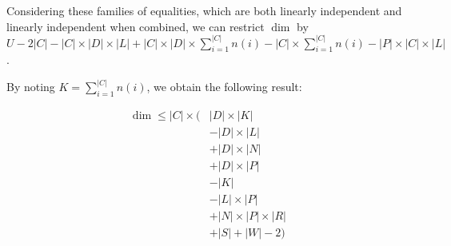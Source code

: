 Considering these families of equalities, which are both linearly independent and linearly independent when combined, we can restrict $\dim$ by $U - 2|C| - |C| \times |D| \times |L| + |C| \times |D| \times \sum_{i=1}^{|C|} n(i) - |C| \times \sum_{i=1}^{|C|} n(i) - |P| \times |C| \times |L|$.

By noting $K = \sum_{i=1}^{|C|} n(i)$, we obtain the following result:

\begin{thm}
\begin{align*}
\dim \le |C| \times (&|D| \times |K|
                     \\&- |D| \times |L|
                     \\&+ |D| \times |N|
                     \\&+ |D| \times |P|
                     \\&- |K|
                     \\&- |L| \times |P|
                     \\&+ |N| \times |P| \times |R|
                     \\&+ |S| + |W| - 2)
\end{align*}
\end{thm}

